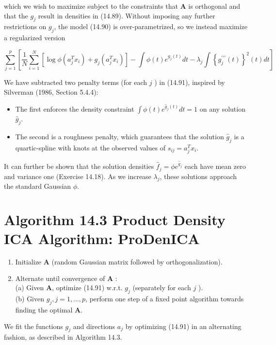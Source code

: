 \documentclass[10pt]{article}
\begin{document}
which we wish to maximize subject to the constraints that $\mathbf{A}$ is orthogonal and that the $g_{j}$ result in densities in (14.89). Without imposing any further restrictions on $g_{j}$, the model (14.90) is over-parametrized, so we instead maximize a regularized version


\begin{equation*}
\sum_{j=1}^{p}\left[\frac{1}{N} \sum_{i=1}^{N}\left[\log \phi\left(a_{j}^{T} x_{i}\right)+g_{j}\left(a_{j}^{T} x_{i}\right)\right]-\int \phi(t) e^{g_{j}(t)} d t-\lambda_{j} \int\left\{g_{j}^{\prime \prime \prime}(t)\right\}^{2}(t) d t\right] \tag{14.91}
\end{equation*}


We have subtracted two penalty terms (for each $j$ ) in (14.91), inspired by Silverman (1986, Section 5.4.4):

\begin{itemize}
  \item The first enforces the density constraint $\int \phi(t) e^{\hat{g}_{j}(t)} d t=1$ on any solution $\hat{g}_{j}$.
  \item The second is a roughness penalty, which guarantees that the solution $\hat{g}_{j}$ is a quartic-spline with knots at the observed values of $s_{i j}=a_{j}^{T} x_{i}$.
\end{itemize}

It can further be shown that the solution densities $\hat{f}_{j}=\phi e^{\hat{g}_{j}}$ each have mean zero and variance one (Exercise 14.18). As we increase $\lambda_{j}$, these solutions approach the standard Gaussian $\phi$.

\section*{Algorithm 14.3 Product Density ICA Algorithm: ProDenICA}
\begin{enumerate}
  \item Initialize $\mathbf{A}$ (random Gaussian matrix followed by orthogonalization).
  \item Alternate until convergence of $\mathbf{A}$ :\\
(a) Given $\mathbf{A}$, optimize (14.91) w.r.t. $g_{j}$ (separately for each $j$ ).\\
(b) Given $g_{j}, j=1, \ldots, p$, perform one step of a fixed point algorithm towards finding the optimal $\mathbf{A}$.
\end{enumerate}

We fit the functions $g_{j}$ and directions $a_{j}$ by optimizing (14.91) in an alternating fashion, as described in Algorithm 14.3.
\end{document}
